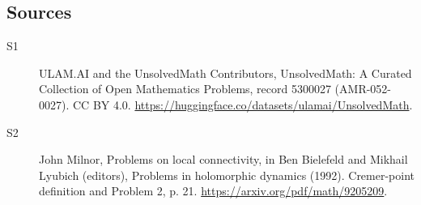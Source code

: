 \documentclass[11pt]{article}
\begin{document}
\subsection{Sources}
\begin{description}
\item[\hypertarget{source:5300027:1}{S1}] ULAM.AI and the UnsolvedMath Contributors, UnsolvedMath: A Curated Collection of Open Mathematics Problems, record 5300027 (AMR-052-0027). CC BY 4.0. \url{https://huggingface.co/datasets/ulamai/UnsolvedMath}.
\item[\hypertarget{source:5300027:2}{S2}] John Milnor, Problems on local connectivity, in Ben Bielefeld and Mikhail Lyubich (editors), Problems in holomorphic dynamics (1992). Cremer-point definition and Problem 2, p. 21. \url{https://arxiv.org/pdf/math/9205209}.
\end{description}
\label{end:5300027}
\end{document}
